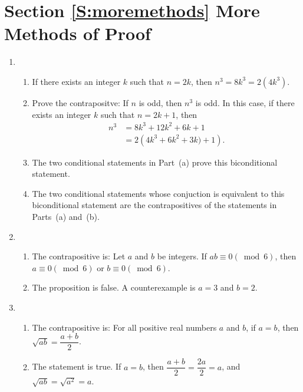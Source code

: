 \section*{Section \ref{S:moremethods} More Methods of Proof}

\begin{enumerate}
\item \begin{enumerate}
\item If there exists an integer $k$ such that $n = 2k$, then $n^3 = 8k^3 = 2 \left( 4k^3 \right)$.

\item Prove the contrapositve:  If $n$ is odd, then $n^3$ is odd.  In this case, if there exists an integer $k$ such that $n = 2k + 1$, then
\[
\begin{aligned}
n^3 &= 8k^3 + 12k^2 + 6k + 1 \\
    &= 2 \left( 4k^3 + 6k^2 + 3k) + 1\right).
\end{aligned}
\]

\item The two conditional statements in Part~(a) prove this biconditional statement.

\item The two conditional statements whose conjuction is equivalent to this biconditional statement are the contrapositives of the statements in Parts~(a) and~(b).
\end{enumerate}

\item \begin{enumerate}
\item The contrapositive is:  Let  $a$  and  $b$  be integers.  If  
$ab \equiv 0\left( {\bmod 6} \right)$, then  $a \equiv 0\left( {\bmod 6} \right)$  or   
$b \equiv 0\left( {\bmod 6} \right)$.

\item The proposition is false.  A counterexample is $a = 3$ and $b = 2$.
\end{enumerate}

\item \begin{enumerate}
\item The contrapositive is:  For all positive real numbers $a$ and $b$,  if $a = b$, then 
$\sqrt{ab} = \dfrac{a + b}{2}$.

\item The statement is true.  If $a = b$, then $\dfrac{a + b}{2} = \dfrac{2a}{2} = a$, and \\
$\sqrt{ab} = \sqrt{a^2} = a$.
\end{enumerate}




\end{enumerate}
